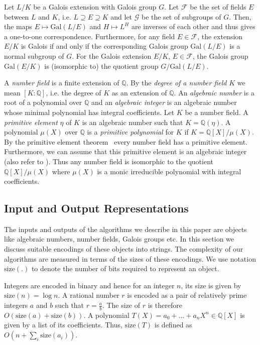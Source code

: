 \documentclass[prodmod,acmtalg]{acmsmall}
\newcommand{\size}[1]{{\ensuremath{\mathrm{size}\left(#1\right)}}}
\newcommand{\Gal}[1]{{\ensuremath{\mathrm{Gal}\left(#1\right)}}}
\newcommand{\Q}{\ensuremath{\mathbb{Q}}}
\begin{document}
\begin{theorem} \label{thm-funda-galois}
  Let $L/K$ be a Galois extension with Galois group $G$. Let
  $\mathcal{F}$ be the set of fields $E$ between $L$ and $K$, i.e. $L
  \supseteq E \supseteq K$ and let $\mathcal{G}$ be the set of
  subgroups of $G$. Then, the maps $E \mapsto \Gal{L/E}$ and $H
  \mapsto L^H$ are inverses of each other and thus gives a one-to-one
  correspondence.  Furthermore, for any field $E \in \mathcal{F}$, the
  extension $E/K$ is Galois if and only if the corresponding Galois
  group $\Gal{L/E}$ is a normal subgroup of $G$. For the Galois
  extension $E/K$, $E\in \mathcal{F}$, the Galois group $\Gal{E/K}$ is
  (isomorphic to) the quotient group $G/\Gal{L/E}$.
\end{theorem}

A \emph{number field} is a finite extension of $\Q$. By the
\emph{degree of a number field} $K$ we mean $[K:\Q]$, i.e. the degree
of $K$ as an extension of $\Q$. An \emph{algebraic number} is a root
of a polynomial over $\Q$ and an \emph{algebraic integer} is an
algebraic number whose minimal polynomial has integral coefficients.
Let $K$ be a number field. A \emph{primitive element} $\eta$ of $K$ is
an algebraic number such that $K = \Q(\eta)$. A polynomial $\mu(X)$
over $\Q$ is a \emph{primitive polynomial} for $K$ if $K =
\Q[X]/\mu(X)$. By the primitive element theorem~\cite[Theorem 4.6,
  Chapter V]{lang:algebra} every number field has a primitive element.
Furthermore, we can assume that this primitive element is an algebraic
integer~\cite[Proposition 1.1, Chapter VII]{lang:algebra} (also refer
to \cite{waerden:1991}). Thus any number field is isomorphic to the
quotient $\Q[X]/\mu(X)$ where $\mu(X)$ is a monic irreducible
polynomial with integral coefficients.

\subsection{Input and Output Representations}

The inputs and outputs of the algorithms we describe in this paper are
objects like algebraic numbers, number fields, Galois groups etc. In
this section we discuss suitable encodings of these objects into
strings.  The complexity of our algorithms are measured in terms of
the sizes of these encodings. We use notation $\size{.}$ to denote
the number of bits required to represent an object.

Integers are encoded in binary and hence for an integer $n$, its size
is given by $\size{n} = \log{n}$. A rational number $r$ is encoded as
a pair of relatively prime integers $a$ and $b$ such that $r =
\frac{a}{b}$. The size of $r$ is therefore $O(\size{a} + \size{b})$.
A polynomial $T(X) = a_0 + \ldots + a_n X^n \in\Q[X]$ is given by a
list of its coefficients.  Thus, $\size{T}$ is defined as $O\left(n +
\sum_i \size{a_i}\right)$.
\end{document}
